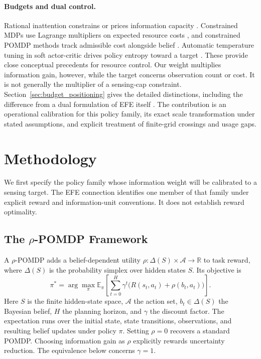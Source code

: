 \documentclass[manuscript, screen, review]{jair}
\begin{document}
\paragraph{Budgets and dual control.}
Rational inattention constrains or prices information capacity \citep{sims2003,matejka2015}. Constrained MDPs use Lagrange multipliers on expected resource costs \citep{altman1999}, and constrained POMDP methods track admissible cost alongside belief \citep{kim2011cpomdp}. Automatic temperature tuning in soft actor-critic drives policy entropy toward a target \citep{haarnoja2018sac}. These provide close conceptual precedents for resource control. Our weight multiplies information gain, however, while the target concerns observation count or cost. It is not generally the multiplier of a sensing-cap constraint. Section~\ref{sec:budget_positioning} gives the detailed distinctions, including the difference from a dual formulation of EFE itself \citep{kouw2026bethe}. The contribution is an operational calibration for this policy family, its exact scale transformation under stated assumptions, and explicit treatment of finite-grid crossings and usage gaps.

\section{Methodology}
\label{sec:methodology}

We first specify the policy family whose information weight will be calibrated to a sensing target. The EFE connection identifies one member of that family under explicit reward and information-unit conventions. It does not establish reward optimality.

\subsection{The $\rho$-POMDP Framework}

A $\rho$-POMDP adds a belief-dependent utility $\rho:\Delta(S)\times\mathcal{A}\to\mathbb{R}$ to task reward, where $\Delta(S)$ is the probability simplex over hidden states $S$. Its objective is
\begin{equation}
\pi^* = \arg\max_\pi \mathbb{E}_\pi\!\left[\sum_{t=0}^{H}\gamma^t\big(R(s_t,a_t)+\rho(b_t,a_t)\big)\right].
\end{equation}
Here $S$ is the finite hidden-state space, $\mathcal A$ the action set, $b_t\in\Delta(S)$ the Bayesian belief, $H$ the planning horizon, and $\gamma$ the discount factor. The expectation runs over the initial state, state transitions, observations, and resulting belief updates under policy $\pi$. Setting $\rho=0$ recovers a standard POMDP. Choosing information gain as $\rho$ explicitly rewards uncertainty reduction. The equivalence below concerns $\gamma=1$.
\end{document}
